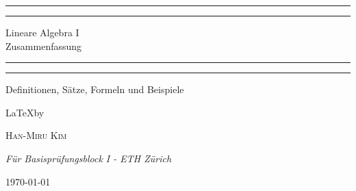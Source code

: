 
\begin{titlepage} %

	\centering %
	
	\scshape %
	
	\vspace*{5\baselineskip} %
    
	\rule{\textwidth}{1.6pt}\vspace*{-\baselineskip}\vspace*{2pt} %
	\rule{\textwidth}{0.4pt} %
	
	\vspace{0.75\baselineskip} %
	
	{\LARGE Lineare Algebra I\\ Zusammenfassung} %
	
	\vspace{0.75\baselineskip} %
	
	\rule{\textwidth}{0.4pt}\vspace*{-\baselineskip}\vspace{3.2pt} %
	\rule{\textwidth}{1.6pt} %
	
	\vspace{2\baselineskip} %
	
	
	Definitionen, Sätze, Formeln und Beispiele %
	
	\vspace*{3\baselineskip} %
	
	
	\LaTeX \quad  by 
	
	\vspace{0.5\baselineskip} %
	
	{\scshape\Large Han-Miru Kim} %
	
	\vspace{0.5\baselineskip} %
	
	\textit{Für Basisprüfungsblock I - ETH Zürich} %
	
	\vfill %
	
	
	
	\vspace{0.3\baselineskip} %
	
	\today %
	

\end{titlepage}